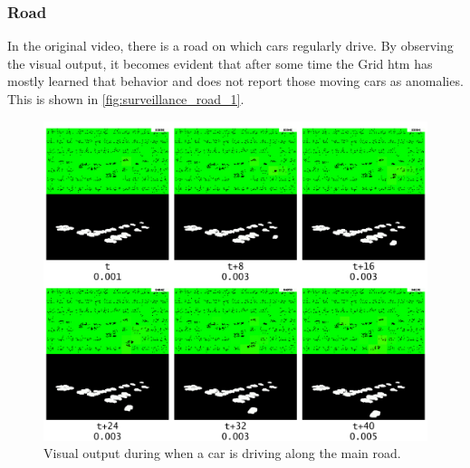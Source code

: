\subsubsection{Road}
In the original video, there is a road on which cars regularly drive. By observing the visual output, it becomes evident that after some time the Grid \gls*{htm} has mostly learned that behavior and does not report those moving cars as anomalies. This is shown in \autoref{fig:surveillance_road_1}.
\begin{figure}[H]
    \centering
    \includegraphics[width=\textwidth]{resources/experiments/surveillance/surveillance_road_1.png}
    \caption[Car Driving Along Main Road]{Visual output during when a car is driving along the main road.}
    \label{fig:surveillance_road_1}
\end{figure}
